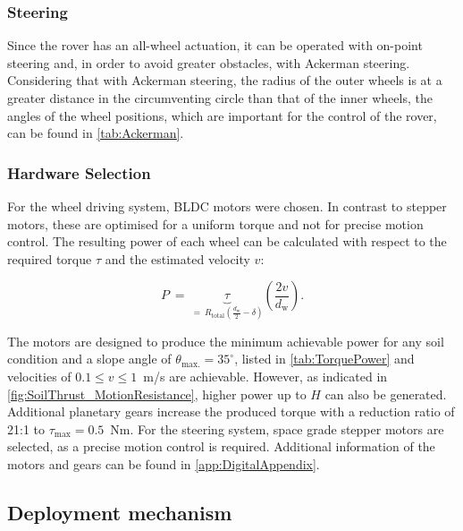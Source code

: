 \subsubsection*{Steering}
\label{sec:Steering}

Since the rover has an all-wheel actuation, it can be operated with on-point steering and, in order to avoid greater obstacles, with Ackerman steering. Considering that with Ackerman steering, the radius of the outer wheels is at a greater distance in the circumventing circle than that of the inner wheels, the angles of the wheel positions, which are important for the control of the rover, can be found in \autoref{tab:Ackerman}.



\subsubsection*{Hardware Selection}
\label{sec:HardwareLoco}

For the wheel driving system, BLDC motors were chosen. In contrast to stepper motors, these are optimised for a uniform torque and not for precise motion control. The resulting power of each wheel can be calculated with respect to the required torque \(\tau\) and the estimated velocity \(v\):

\begin{equation}
	P \:  = \:	\underbrace{\tau}_{= \:	R_\text{total} \left(\frac{d_\text{w}}{2} - \delta \right)} \left(\frac{2v}{d_\text{w}} \right).
	\label{eq:power}
\end{equation}

The motors are designed to produce the minimum achievable power for any soil condition and a slope angle of \(\theta_\text{max.} = 35^\circ\), listed in \autoref{tab:TorquePower} and velocities of \(0.1 \leq v \leq 1\)~m/s are achievable. However, as indicated in \autoref{fig:SoilThrust_MotionResistance}, higher power up to \(H\) can also be generated. Additional planetary gears increase the produced torque with a reduction ratio of 21:1 to \(\tau_\text{max} = 0.5\)~Nm. For the steering system, space grade stepper motors are selected, as a precise motion control is required. Additional information of the motors and gears can be found in \autoref{app:DigitalAppendix}.


\subsection{Deployment mechanism}

